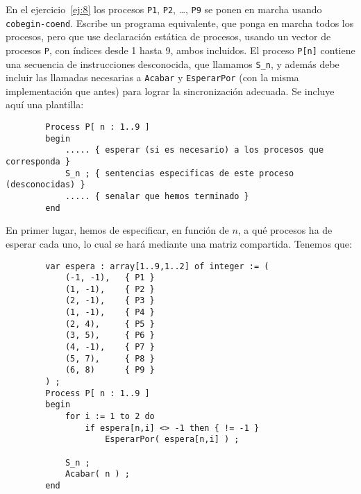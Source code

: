 \begin{ejercicio}
    En el ejercicio~\ref{ej:8} los procesos \verb|P1|, \verb|P2|, \ldots, \verb|P9| se ponen en marcha usando \verb|cobegin-coend|.
    Escribe un programa equivalente, que ponga en marcha todos los procesos, pero que use declaración
    estática de procesos, usando un vector de procesos \verb|P|, con índices desde 1 hasta 9, ambos incluidos. El proceso \verb|P[n]| contiene una secuencia de instrucciones desconocida, que llamamos \verb|S_n|, y además debe incluir las llamadas necesarias a \verb|Acabar| y \verb|EsperarPor| (con la misma implementación que antes) para lograr la sincronización adecuada. Se incluye aquí una plantilla:
    \begin{verbatim}
        Process P[ n : 1..9 ]
        begin
            ..... { esperar (si es necesario) a los procesos que corresponda }
            S_n ; { sentencias especificas de este proceso (desconocidas) }
            ..... { senalar que hemos terminado }
        end
    \end{verbatim}

    En primer lugar, hemos de especificar, en función de $n$, a qué procesos ha de esperar cada uno, lo cual se hará mediante una matriz compartida. Tenemos que:
    \begin{verbatim}
        var espera : array[1..9,1..2] of integer := (
            (-1, -1),   { P1 }
            (1, -1),    { P2 }
            (2, -1),    { P3 }
            (1, -1),    { P4 }
            (2, 4),     { P5 }
            (3, 5),     { P6 }
            (4, -1),    { P7 }
            (5, 7),     { P8 }
            (6, 8)      { P9 }
        ) ;
        Process P[ n : 1..9 ]
        begin
            for i := 1 to 2 do
                if espera[n,i] <> -1 then { != -1 }
                    EsperarPor( espera[n,i] ) ;
            
            S_n ;
            Acabar( n ) ;
        end
    \end{verbatim}
\end{ejercicio}

